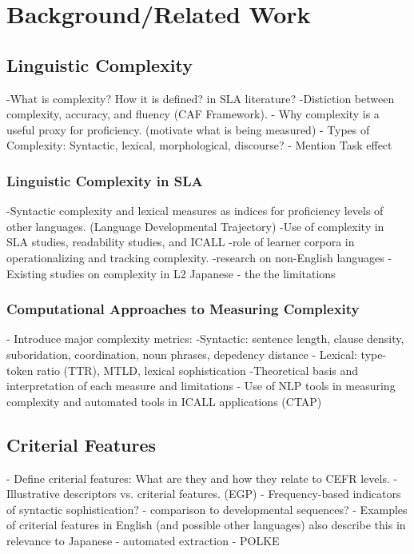 \chapter{Background/Related Work}

\section{Linguistic Complexity}
-What is complexity? How it is defined? in SLA literature?
-Distiction between complexity, accuracy, and fluency (CAF Framework).
- Why complexity is a useful proxy for proficiency. (motivate what is being measured)
- Types of Complexity: Syntactic, lexical, morphological, discourse?
- Mention Task effect


\subsection{Linguistic Complexity in SLA}
-Syntactic complexity and lexical measures as indices for proficiency levels of other languages. (Language Developmental Trajectory)
-Use of complexity in SLA studies, readability studies, and ICALL
-role of learner corpora in operationalizing and tracking complexity.
-research on non-English languages
-Existing studies on complexity in L2 Japanese - the the limitations


\subsection{Computational Approaches to Measuring Complexity}
- Introduce major complexity metrics:
    -Syntactic: sentence length, clause density, suboridation, coordination, noun phrases, depedency distance
    - Lexical: type-token ratio (TTR), MTLD, lexical sophistication
-Theoretical basis and interpretation of each measure and limitations
- Use of NLP tools in measuring complexity and automated tools in ICALL applications (CTAP)

\section{Criterial Features}
- Define criterial features: What are they and how they relate to CEFR levels.
- Illustrative descriptors vs. criterial features. (EGP)
- Frequency-based indicators of syntactic sophistication? \cite{Ellis2004}
    - comparison to developmental sequences?
- Examples of criterial features in English (and possible other languages) also describe this in relevance to Japanese
- automated extraction - POLKE


